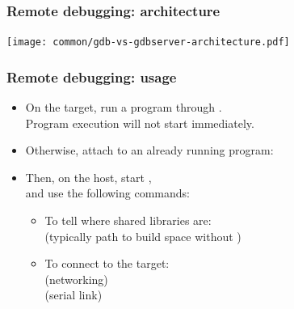 \begin{frame}
  \frametitle{Remote debugging: architecture}
  \begin{center}
    \texttt{[image: common/gdb-vs-gdbserver-architecture.pdf]}
  \end{center}
\end{frame}

\begin{frame}
  \frametitle{Remote debugging: usage}
  \begin{itemize}
  \item On the target, run a program through .\\
    Program execution will not start immediately.\\
  \item Otherwise, attach  to an already running program:\\
  \item Then, on the host, start ,\\
    and use the following  commands:
    \begin{itemize}
    \item To tell  where shared libraries are:\\
       (typically path to build space without )
    \item To connect to the target:\\
       (networking)\\
       (serial link)
    \end{itemize}
  \end{itemize}
\end{frame}

